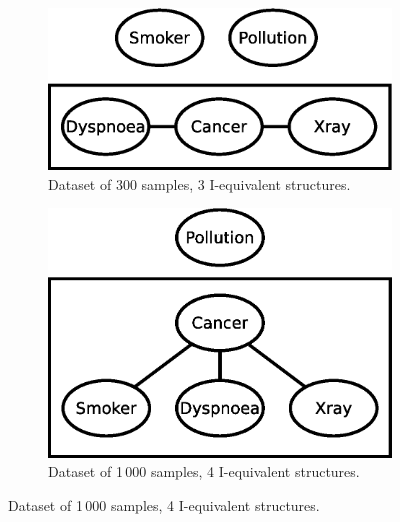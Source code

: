 \documentclass[english,cover]{fitthesis} %
\begin{document}
\begin{figure}[ht]
    \centering
    \begin{subfigure}[b]{0.45\linewidth}
        \centering
        \includegraphics[scale=0.4]{fig/structure-learning-cancer-300}
        \caption{Dataset of 300 samples, 3 I-equivalent structures.}
        \label{fig:structure-learning-cancer-300}
    \end{subfigure}
    \quad
    \begin{subfigure}[b]{0.45\linewidth}
        \centering
        \includegraphics[scale=0.4]{fig/structure-learning-cancer-1000}
        \caption{Dataset of 1\,000 samples, 4 I-equivalent structures.}
        \label{fig:structure-learning-cancer-1000}
    \end{subfigure}
        

\end{figure}
\end{document}
